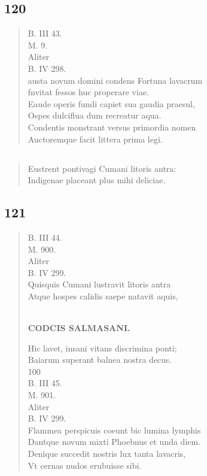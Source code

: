 \documentclass[11pt, a4paper]{report}
\begin{document}
            \subsection*{120}
      \begin{verse}
      B. III 43. \\ M. 9. \\ Aliter \\ B. IV 298. \\ austa novum domini condens Fortuna lavacrum \\ fnvitat fessos huc properare viae. \\ Eaude operis fundi capiet sua gaudia praesul, \\ Ospes dulciflua dum recreatur aqua. \\ Condentis monstrant versus primordia nomen \\ Auctoremque facit littera prima legi. \\ 
      \end{verse}
  
            \subsection*{}
      \begin{verse}
      Eustrent pontivagi Cumani litoris antra: \\ Indigenae placeant plus mihi deliciae. \\ 
      \end{verse}
  
            \subsection*{121}
      \begin{verse}
      B. III 44. \\ M. 900. \\ Aliter \\ B. IV 299. \\ Quisquis Cumani lustravit litoris antra \\ Atque hospes calidis saepe natavit aquis, \\ 
        ﻿\pagebreak 
    \begin{center} \textbf{CODCIS SALMASANI.} \end{center} \marginpar{[135]} Hic lavet, insani vitans discrimina ponti; \\ Baiarum superant balnea nostra decus. \\ 100 \\ B. III 45. \\ M. 901. \\ Aliter \\ B. IV 299. \\ Flammea perspicuis coeunt bic lumina lymphis \\ Dantque novum mixti Phoebnus et unda diem. \\ Denique succedit nostris lux tanta lavacris, \\ Vt cernas nudos erubuisse sibi. \\ 
      \end{verse}
  
\end{document}
